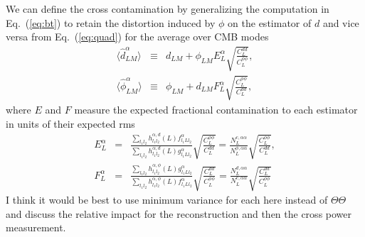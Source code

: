 \documentclass[prd,amsmath,amssymb,floatfix,superscriptaddress,nofootinbib,twocolumn]{revtex4-1}
\def\bea{\begin{eqnarray}}
\def\eea{\end{eqnarray}}
\newcommand{\ec}[1]{Eq.~(\ref{eq:#1})}
\newcommand{\wh}[1]{{\color{red} #1}}
\begin{document}
 We can define the cross contamination by generalizing the computation in \ec{bt} to retain the distortion induced by $\phi$ on the estimator of $d$ and vice
 versa from \ec{quad} for the average over CMB modes
 \bea
 \langle \hat{d}^{\alpha}_{LM} \rangle &\equiv& d_{LM} +\phi_{LM}E_{L}^{\alpha}\sqrt{\frac{C_L^{dd}}{C_L^{\phi\phi}}}, \nonumber\\
 \langle \hat{\phi}^{\alpha}_{LM} \rangle &\equiv& \phi_{LM} +d_{LM}F_{L}^{\alpha}\sqrt{\frac{C_L^{\phi\phi}}{C_L^{dd}}},
\eea
 where $E$ and $F$ measure the expected fractional contamination to each estimator in units of their expected rms 
\bea
E^{\alpha}_{L} &=& \frac{\sum_{l_{1}l_{2}}h_{l_{1}l_{2}}^{\alpha,d}(L)f_{l_{1}Ll_{2}}^{\alpha}}{\sum_{l_{1}l_{2}}h_{l_{1}l_{2}}^{\alpha,d}(L)g_{l_{1}Ll_{2}}^{\alpha}} \sqrt{\frac{C_{L}^{\phi\phi}}{C_{L}^{dd}}}=\frac{N_{L}^{c,\alpha\alpha}}{N_{L}^{\phi,\alpha\alpha}}\sqrt{\frac{C_{L}^{\phi\phi}}{C_{L}^{dd}}},\nonumber\\
F^{\alpha}_{L} &=& \frac{\sum_{l_{1}l_{2}}h_{l_{1}l_{2}}^{\alpha,\phi}(L)g_{l_{1}Ll_{2}}^{\alpha}}{\sum_{l_{1}l_{2}}h_{l_{1}l_{2}}^{\alpha,\phi}(L)f_{l_{1}Ll_{2}}^{\alpha}} \sqrt{\frac{C_{L}^{dd}}{C_{L}^{\phi\phi}}}=\frac{N_{L}^{d,\alpha\alpha}}{N_{L}^{c,\alpha\alpha}}\sqrt{\frac{C_{L}^{dd}}{C_{L}^{\phi\phi}}}
\eea
 \wh{I think it would be best to use minimum variance for each here instead of
 $\Theta\Theta$ and discuss the relative impact for the reconstruction and then the cross power measurement.}
 
\end{document}
